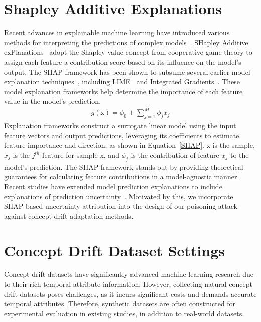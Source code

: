 \documentclass[lettersize,journal]{IEEEtran}
\begin{document}
\section*{Shapley Additive Explanations}
\label{Sec: Shapley Additive Explanations}
Recent advances in explainable machine learning have introduced various methods for interpreting the predictions of complex models~\cite{ali2023explainable}.
SHapley Additive exPlanations~\cite{lundberg2017unified} adopt the Shapley value concept from cooperative game theory to assign each feature a contribution score based on its influence on the model's output.
The SHAP framework has been shown to subsume several earlier model explanation techniques~\cite{2021-Usenix-Poisoning-Attack-Explanation-guided-Backdoor}, including LIME~\cite{ribeiro2016should} and Integrated Gradients~\cite{sundararajan2017axiomatic}. 
These model explanation frameworks help determine the importance of each feature value in the model's prediction.
\begin{equation}
	\begin{aligned}
		g(\bm{\mathrm{x}}) = \phi_{0} + \sum_{j=1}^{M} \phi_{j} x_{j}
	\end{aligned}
	\label{SHAP}
\end{equation}
Explanation frameworks construct a surrogate linear model using the input feature vectors and output predictions, leveraging its coefficients to estimate feature importance and direction, as shown in Equation~\ref{SHAP}.
$\bm{\mathrm{x}}$ is the sample, $x_{j}$ is the $j^{th}$ feature for sample $\bm{\mathrm{x}}$, and $\phi_{j}$ is the contribution of feature $x_{j}$ to the model’s prediction.
The SHAP framework stands out by providing theoretical guarantees for calculating feature contributions in a model-agnostic manner.
Recent studies have extended model prediction explanations to include explanations of prediction uncertainty~\cite{NEURIPS2023_16e4be78}.
Motivated by this, we incorporate SHAP-based uncertainty attribution into the design of our poisoning attack against concept drift adaptation methods.

\section*{Concept Drift Dataset Settings}
\label{Sec: Concept Drift Dataset Settings}
Concept drift datasets have significantly advanced machine learning research due to their rich temporal attribute information.
However, collecting natural concept drift datasets poses challenges, as it incurs significant costs and demands accurate temporal attributes.
Therefore, synthetic datasets are often constructed for experimental evaluation in existing studies, in addition to real-world datasets.
\end{document}
